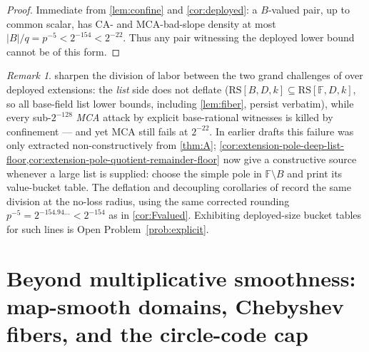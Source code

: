 \documentclass[11pt]{article}
\theoremstyle{definition}
\theoremstyle{remark}
\newtheorem{remark}[theorem]{Remark}
\newcommand{\F}{\mathbb{F}}
\newcommand{\B}{B}
\newcommand{\RS}{\mathrm{RS}}
\begin{document}
\begin{proof}
Immediate from \cref{lem:confine} and \cref{cor:deployed}: a $\B$-valued pair, up to common scalar, has CA- and MCA-bad-slope density at most $|\B|/q=p^{-5}<2^{-154}<2^{-22}$. Thus any pair witnessing the deployed lower bound cannot be of this form.
\end{proof}

\begin{remark}
 sharpen the division of labor between the two grand challenges of \cite{ABF26} over deployed extensions: the \emph{list} side does not deflate ($\RS[\B,D,k]\subseteq\RS[\F,D,k]$, so all base-field list lower bounds, including \cref{lem:fiber}, persist verbatim), while every sub-$2^{-128}$ \emph{MCA} attack by explicit base-rational witnesses is killed by confinement --- and yet MCA still fails at $2^{-22}$.  In earlier drafts this failure was only extracted non-constructively from \cref{thm:A}; \cref{cor:extension-pole-deep-list-floor,cor:extension-pole-quotient-remainder-floor} now give a constructive source whenever a large list is supplied: choose the simple pole in $\F\setminus\B$ and print its value-bucket table. The deflation and decoupling corollaries of \cite{Cho26b} record the same division at the no-loss radius, using the same corrected rounding $p^{-5}=2^{-154.94\ldots}<2^{-154}$ as in \cref{cor:Fvalued}. Exhibiting deployed-size bucket tables for such lines is Open Problem~\ref{prob:explicit}.
\end{remark}


\section{Beyond multiplicative smoothness: map-smooth domains, Chebyshev fibers, and the circle-code cap}\label{sec:isogeny}
\end{document}
